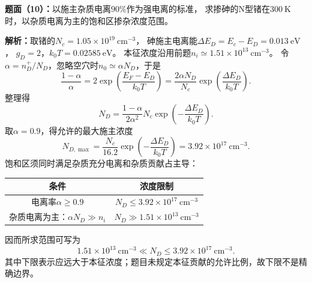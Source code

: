 \begin{problem}
    \textbf{题面（10）：}以施主杂质电离$90\%$作为强电离的标准，
    求掺砷的N型锗在$300\ \mathrm{K}$时，以杂质电离为主的饱和区掺杂浓度范围。

    \textbf{解析：}取锗的$N_c=1.05\times10^{19}\ \mathrm{cm}^{-3}$，
    砷施主电离能$\Delta E_D=E_c-E_D=0.013\ \mathrm{eV}$，
    $g_D=2$，$k_0T=0.02585\ \mathrm{eV}$。
    本征浓度沿用前题$n_i\simeq1.51\times10^{13}\ \mathrm{cm}^{-3}$。
    令$\alpha=n_D^+/N_D$，忽略空穴时$n_0\simeq\alpha N_D$，于是
    \[
    \frac{1-\alpha}{\alpha}
    =2\exp\!\left(\frac{E_F-E_D}{k_0T}\right)
    =\frac{2\alpha N_D}{N_c}\exp\!\left(\frac{\Delta E_D}{k_0T}\right).
    \]
    整理得
    \[
    N_D=\frac{1-\alpha}{2\alpha^2}N_c
    \exp\!\left(-\frac{\Delta E_D}{k_0T}\right).
    \]
    取$\alpha=0.9$，得允许的最大施主浓度
    \[
    N_{D,\max}=\frac{N_c}{16.2}\exp\!\left(-\frac{\Delta E_D}{k_0T}\right)
    =3.92\times10^{17}\ \mathrm{cm}^{-3}.
    \]
    饱和区须同时满足杂质充分电离和杂质贡献占主导：
    \begin{center}
        \small
        \begin{tabular}{c c}
            \hline
            条件 & 浓度限制 \\
            \hline
            电离率$\alpha\geq0.9$ & $N_D\leq3.92\times10^{17}\ \mathrm{cm}^{-3}$ \\
            杂质电离为主：$\alpha N_D\gg n_i$ & $N_D\gg1.51\times10^{13}\ \mathrm{cm}^{-3}$ \\
            \hline
        \end{tabular}
    \end{center}
    因而所求范围可写为
    \[
    \boxed{1.51\times10^{13}\ \mathrm{cm}^{-3}\ll N_D
    \leq3.92\times10^{17}\ \mathrm{cm}^{-3}}.
    \]
    其中下限表示应远大于本征浓度；题目未规定本征贡献的允许比例，故下限不是精确边界。
\end{problem}

